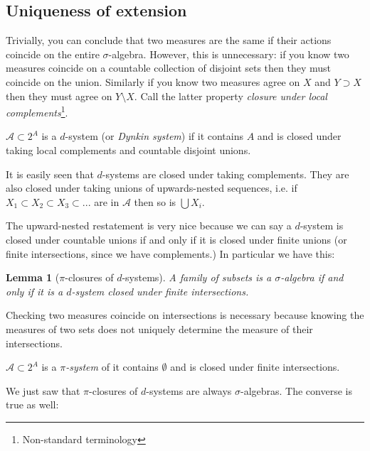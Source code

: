 \documentclass[9pt]{report}
\newtheorem[L]{theorem}{Theorem}[chapter]
\newtheorem{lemma}[theorem]{Lemma}
\newtheorem[L,nocut]{definition}[theorem]{Definition}
\newtheorem[S,nounderline]{remark}[theorem]{Remarks}
\begin{document}
\subsection{Uniqueness of extension}
 
Trivially, you can conclude that two measures are the same if their actions coincide on the entire \(\sigma\)-algebra. However, this is unnecessary: if you know two measures coincide on a countable collection of disjoint sets then they must coincide on the union. Similarly if you know two measures agree on \(X\) and \(Y \supset X\) then they must agree on \(Y\setminus X\). Call the latter property \emph{closure under local complements}\footnote{Non-standard terminology}. 

\begin{definition}[\(d\)-systems]
	\(\mathcal{A} \subset 2^A\) is a \(d\)-system (or \emph{Dynkin system}) if it contains \(A\) and is closed under taking local complements and countable disjoint unions.
\end{definition}

It is easily seen that \(d\)-systems are closed under taking complements. They are also closed under taking unions of upwards-nested sequences, i.e. if \(X_1 \subset X_2 \subset X_3 \subset ...\) are in \(\mathcal{A}\) then so is \(\bigcup X_i\).  

The upward-nested restatement is very nice because we can say a \(d\)-system is closed under countable unions if and only if it is closed under finite unions (or finite intersections, since we have complements.) In particular we have this: 

\begin{lemma}[\(\pi\)-closures of \(d\)-systems]
	A family of subsets is a \(\sigma\)-algebra if and only if it is a \(d\)-system closed under finite intersections. 
\end{lemma}

Checking two measures coincide on intersections is necessary because knowing the measures of two sets does not uniquely determine the measure of their intersections. 

\begin{definition}[\(\pi\)-systems]
	\(\mathcal{A} \subset 2^A\) is a \emph{\(\pi\)-system} of it contains \(\emptyset\) and is closed under finite intersections.
\end{definition}

We just saw that \(\pi\)-closures of \(d\)-systems are always \(\sigma\)-algebras. The converse is true as well:
\end{document}
